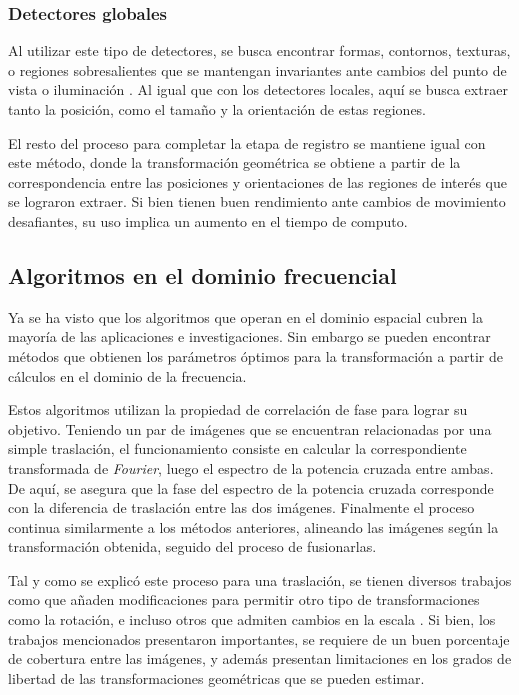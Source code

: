 \subsubsection*{Detectores globales}

Al utilizar este tipo de detectores, se busca encontrar formas, contornos, texturas, o regiones sobresalientes que se mantengan invariantes ante cambios del punto de vista o iluminación \cite{high-level}. Al igual que con los detectores locales, aquí se busca extraer tanto la posición, como el tamaño y la orientación de estas regiones.

El resto del proceso para completar la etapa de registro se mantiene igual con este método, donde la transformación geométrica se obtiene a partir de la correspondencia entre las posiciones y orientaciones de las regiones de interés que se lograron extraer. Si bien tienen buen rendimiento ante cambios de movimiento desafiantes, su uso implica un aumento en el tiempo de computo.

\subsection*{Algoritmos en el dominio frecuencial}

Ya se ha visto que los algoritmos que operan en el dominio espacial cubren la mayoría de las aplicaciones e investigaciones. Sin embargo se pueden encontrar métodos que obtienen los parámetros óptimos para la transformación a partir de cálculos en el dominio de la frecuencia. 

Estos algoritmos utilizan la propiedad de correlación de fase para lograr su objetivo. Teniendo un par de imágenes que se encuentran relacionadas por una simple traslación, el funcionamiento consiste en calcular la correspondiente transformada de \textit{Fourier}, luego el espectro de la potencia cruzada entre ambas. De aquí, se asegura que la fase del espectro de la potencia cruzada corresponde con la diferencia de traslación entre las dos imágenes. Finalmente el proceso continua similarmente a los métodos anteriores, alineando las imágenes según la transformación obtenida, seguido del proceso de fusionarlas.

Tal y como se explicó este proceso para una traslación, se tienen diversos trabajos como \cite{phase-rot} que añaden modificaciones para permitir otro tipo de transformaciones como la rotación, e incluso otros que admiten cambios en la escala \cite{phase-scale}. Si bien, los trabajos mencionados presentaron importantes, se requiere de un buen porcentaje de cobertura entre las imágenes, y además presentan limitaciones en los grados de libertad de las transformaciones geométricas que se pueden estimar.


